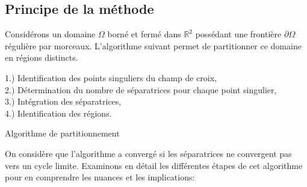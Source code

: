 \subsection{Principe de la méthode}
\label{subsec:principe_methode}

Considérons un domaine $\Omega$ borné et fermé dans $\mathbb{R}^2$ possédant une frontière $\partial\Omega$ régulière par morceaux. L'algorithme suivant permet de partitionner ce domaine en régions distincts.\\


\begin{algorithm}[H]
\label{alg:algo_main}
\vspace{0.2cm}
1.) Identification des points singuliers du champ de croix,\\\vspace{0.2cm}
2.) Détermination du nombre de séparatrices pour chaque point singulier,\\\vspace{0.2cm}
3.) Intégration des séparatrices,\\\vspace{0.2cm}
4.) Identification des régions.\\\vspace{0.2cm}
\caption{Algorithme de partitionnement}
\end{algorithm}
\vspace{0.5cm}
On considère que l'algorithme a convergé si les séparatrices ne convergent pas vers un cycle limite. Examinons en détail les différentes étapes de cet algorithme pour en comprendre les nuances et les implications:
\vspace{0.5cm}

